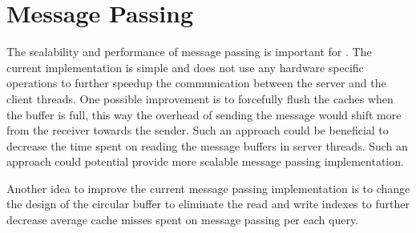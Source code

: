 \section{Message Passing}

The scalability and performance of message passing is important for \cphash{}. The current implementation is simple and does not use
any hardware specific operations to further speedup the communication between the server and the client threads. One possible improvement is to
forcefully flush the caches when the buffer is full, this way the overhead of sending the message would shift more from the receiver towards the sender. 
Such an approach could be beneficial to decrease the time spent on reading the message buffers in server threads. Such an approach could potential provide
more scalable message passing implementation. 

Another idea to improve the current message passing implementation is to change the design of the circular buffer to eliminate the read and write indexes
to further decrease average cache misses spent on message passing per each query. 

